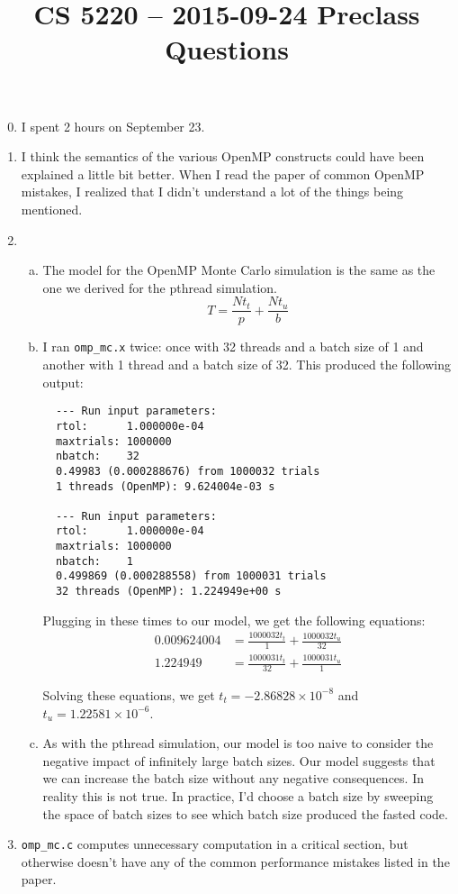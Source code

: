 \documentclass{hw}
\title{CS 5220 -- 2015-09-24 Preclass Questions}
\begin{document}
\maketitle{}

\begin{enumerate}
  \setcounter{enumi}{-1}
  \item
    I spent 2 hours on September 23.

  \item
    I think the semantics of the various OpenMP constructs could have been
    explained a little bit better. When I read the paper of common OpenMP
    mistakes, I realized that I didn't understand a lot of the things being
    mentioned.

  \item
    \begin{enumerate}[a)]
      \item
        The model for the OpenMP Monte Carlo simulation is the same as the one
        we derived for the pthread simulation.
        \[
          T = \frac{N t_t}{p} + \frac{N t_u}{b}
        \]

      \item
        I ran \texttt{omp\_mc.x} twice: once with 32 threads and a batch size
        of 1 and another with 1 thread and a batch size of 32. This produced
        the following output:

  \begin{verbatim}
  --- Run input parameters:
  rtol:      1.000000e-04
  maxtrials: 1000000
  nbatch:    32
  0.49983 (0.000288676) from 1000032 trials
  1 threads (OpenMP): 9.624004e-03 s

  --- Run input parameters:
  rtol:      1.000000e-04
  maxtrials: 1000000
  nbatch:    1
  0.499869 (0.000288558) from 1000031 trials
  32 threads (OpenMP): 1.224949e+00 s\end{verbatim}
        Plugging in these times to our model, we get the following equations:
        \begin{align*}
          0.009624004 &= \frac{1000032 t_t}{1} + \frac{1000032 t_u}{32} \\
          1.224949 &= \frac{1000031 t_t}{32} + \frac{1000031 t_u}{1}
        \end{align*}

        Solving these equations, we get $t_t = -2.86828\times10^{-8}$ and $t_u
        = 1.22581 \times 10^{-6}$.

      \item
      As with the pthread simulation, our model is too naive to consider the
      negative impact of infinitely large batch sizes. Our model suggests that
      we can increase the batch size without any negative consequences. In
      reality this is not true. In practice, I'd choose a batch size by
      sweeping the space of batch sizes to see which batch size produced the
      fasted code.
    \end{enumerate}

  \item
    \texttt{omp\_mc.c} computes unnecessary computation in a critical section,
    but otherwise doesn't have any of the common performance mistakes listed in
    the paper.
\end{enumerate}
\end{document}
